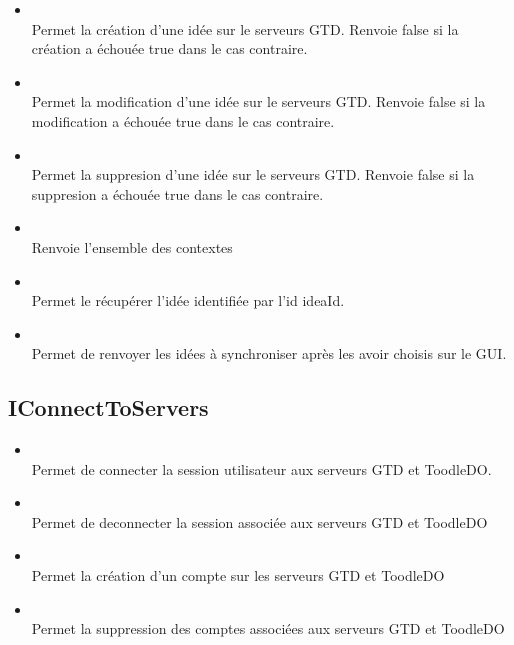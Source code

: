 \begin{itemize}
		
	\item {} \\
	Permet la création  d'une idée sur  le serveurs GTD. Renvoie false si la création a échouée true dans le cas contraire.
	\item {} \\
	Permet la modification  d'une idée sur  le serveurs GTD. Renvoie false si la modification a échouée true dans le cas contraire.
	\item {} \\
	Permet la suppresion  d'une idée  sur  le serveurs GTD. Renvoie false si la suppresion a échouée true dans le cas contraire.
	\item {} \\
	Renvoie l'ensemble des contextes
	\item {} \\
	Permet le récupérer l'idée identifiée par l'id ideaId.
	\item {} \\
	Permet de renvoyer les idées à synchroniser après les avoir choisis sur le GUI.
	
	
	
\end{itemize}	




\subsection{IConnectToServers}

\begin{itemize}
	\item {} \\
	Permet de connecter la session utilisateur aux serveurs GTD et ToodleDO. 
	\item {} \\
	Permet de deconnecter la session associée aux serveurs GTD et ToodleDO	
	\item {} \\
	Permet la création d'un compte sur les serveurs GTD et ToodleDO	
	\item {} \\
	Permet la suppression des comptes associées aux serveurs GTD et ToodleDO	
\end{itemize}	
